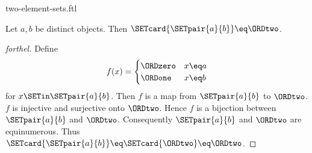 \documentclass{naproche-library}
\begin{document}
\begin{smodule}[title=$2$-Element Sets]{two-element-sets.ftl}

\begin{proposition}[forthel,id=SET_THEORY_07_5465279026954240]
  Let $a, b$ be distinct objects.
  Then $\SETcard{\SETpair{a}{b}} \eq \ORDtwo$.
\end{proposition}
\begin{proof}[forthel]
  Define \[ f(x) =
    \begin{cases}
      \ORDzero & x \eq a
      \\
      \ORDone & x \eq b
    \end{cases} \]
  for $x \SETin \SETpair{a}{b}$.
  Then $f$ is a map from $\SETpair{a}{b}$ to $\ORDtwo$.
  $f$ is injective and surjective onto $\ORDtwo$.
  Hence $f$ is a bijection between $\SETpair{a}{b}$ and $\ORDtwo$.
  Consequently $\SETpair{a}{b}$ and $\ORDtwo$ are equinumerous.
  Thus $\SETcard{\SETpair{a}{b}} \eq \SETcard{\ORDtwo} \eq \ORDtwo$.
\end{proof}
\end{smodule}
\end{document}
